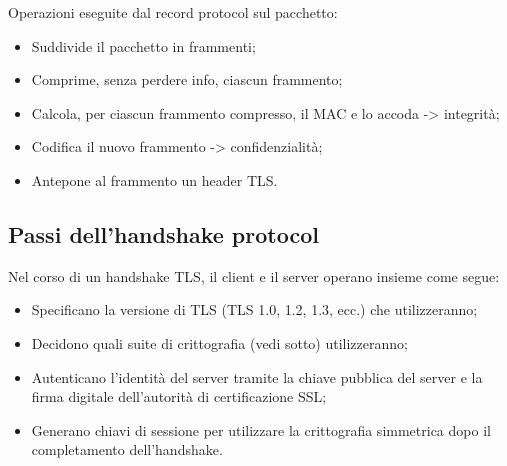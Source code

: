 Operazioni eseguite dal record protocol sul pacchetto:
\begin{itemize}
    \item Suddivide il pacchetto in frammenti;
	\item Comprime, senza perdere info, ciascun frammento;
	\item Calcola, per ciascun frammento compresso, il MAC e lo accoda -> integrità;
	\item Codifica il nuovo frammento -> confidenzialità;
	\item Antepone al frammento un header TLS.
\end{itemize}

\subsection{Passi dell'handshake protocol}

Nel corso di un handshake TLS, il client e il server operano insieme come segue:
\begin{itemize}
    \item Specificano la versione di TLS (TLS 1.0, 1.2, 1.3, ecc.) che utilizzeranno;
	\item Decidono quali suite di crittografia (vedi sotto) utilizzeranno;
	\item Autenticano l'identità del server tramite la chiave pubblica del server e la firma digitale dell'autorità di certificazione SSL;
	\item Generano chiavi di sessione per utilizzare la crittografia simmetrica dopo il completamento dell'handshake.
\end{itemize}

